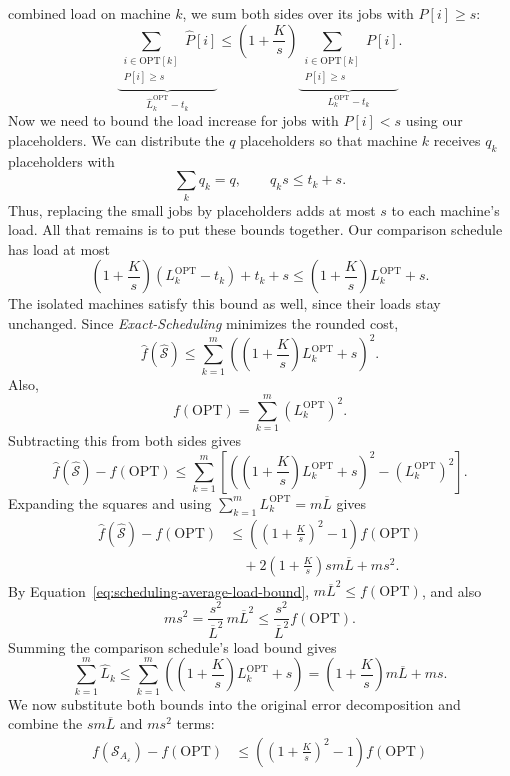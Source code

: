 \documentclass[12pt,a4paper]{article}
\theoremstyle{definition}
\theoremstyle{plain}
\begin{document}
\begin{enumerate}
combined load on machine $k$, we sum both sides over its jobs with
$P[i]\geq s$:
\[
\underbrace{
\sum_{\substack{i\in\mathrm{OPT}[k]\\P[i]\geq s}}\widehat{P}[i]
}_{\widehat{L}_k^{\mathrm{OPT}}-t_k}
\leq
\left(1+\frac{K}{s}\right)
\underbrace{
\sum_{\substack{i\in\mathrm{OPT}[k]\\P[i]\geq s}}P[i]
}_{L_k^{\mathrm{OPT}}-t_k}.
\]
Now we need to bound the load increase for jobs with $P[i]<s$ using our
placeholders.
We can distribute the $q$ placeholders so that machine $k$ receives $q_k$
placeholders with
\[
\sum_k q_k=q,
\qquad q_ks\leq t_k+s.
\]
Thus, replacing the small jobs by placeholders adds at most $s$ to each
machine's load.
All that remains is to put these bounds together.
Our comparison schedule has load at most
\[
\left(1+\frac{K}{s}\right)(L_k^{\mathrm{OPT}}-t_k)+t_k+s
\leq\left(1+\frac{K}{s}\right)L_k^{\mathrm{OPT}}+s.
\]
The isolated machines satisfy this bound as well, since their loads stay
unchanged. Since \textit{Exact-Scheduling} minimizes the rounded cost,
\[
\widehat{f}(\widehat{\mathcal{S}})
\leq\sum_{k=1}^m
\left(\left(1+\frac{K}{s}\right)L_k^{\mathrm{OPT}}+s\right)^2.
\]
Also,
\[
f(\mathrm{OPT})=\sum_{k=1}^m(L_k^{\mathrm{OPT}})^2.
\]
Subtracting this from both sides gives
\[
\widehat{f}(\widehat{\mathcal{S}})-f(\mathrm{OPT})
\leq\sum_{k=1}^m\left[
\left(\left(1+\frac{K}{s}\right)L_k^{\mathrm{OPT}}+s\right)^2-(L_k^{\mathrm{OPT}})^2
\right].
\]
Expanding the squares and using $\sum_{k=1}^m L_k^{\mathrm{OPT}}=m\overline{L}$ gives
\[
\begin{aligned}
\widehat{f}(\widehat{\mathcal{S}})-f(\mathrm{OPT})
&\leq\left(\left(1+\frac{K}{s}\right)^2-1\right)f(\mathrm{OPT})\\
&\quad+2\left(1+\frac{K}{s}\right)sm\overline{L}+ms^2.
\end{aligned}
\]
By Equation~\eqref{eq:scheduling-average-load-bound},
$m\overline{L}^2\leq f(\mathrm{OPT})$, and also
\[
ms^2=\frac{s^2}{\overline{L}^2}\,m\overline{L}^2
\leq\frac{s^2}{\overline{L}^2}f(\mathrm{OPT}).
\]
Summing the comparison schedule's load bound gives
\[
\sum_{k=1}^m\widehat{L}_k
\leq\sum_{k=1}^m\left(\left(1+\frac{K}{s}\right)L_k^{\mathrm{OPT}}+s\right)
=\left(1+\frac{K}{s}\right)m\overline{L}+ms.
\]
We now substitute both bounds into the original error decomposition and
combine the $sm\overline{L}$ and $ms^2$ terms:
\[
\begin{aligned}
f(\mathcal{S}_{A_\varepsilon})-f(\mathrm{OPT})
&\leq\left(\left(1+\frac{K}{s}\right)^2-1\right)f(\mathrm{OPT})\\

\end{aligned}\]
\end{enumerate}
\end{document}
